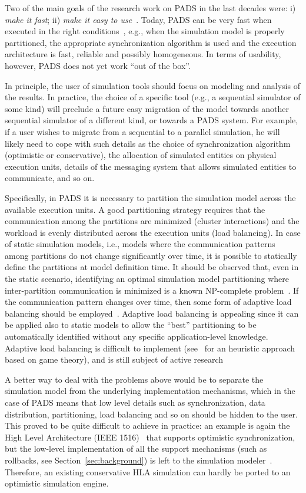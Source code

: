 \documentclass[1p]{elsarticle}
\begin{document}
Two of the main goals of the research work on PADS in the last decades
were: i) \emph{make it fast}; ii) \emph{make it easy to
  use}~\cite{fujtut2000}. Today, PADS can be very fast when executed
in the right conditions~\cite{Perumalla:2007:STW:1242531.1242543},
e.g., when the simulation model is properly partitioned, the
appropriate synchronization algorithm is used and the execution
architecture is fast, reliable and possibly homogeneous. In terms of
usability, however, PADS does not yet work ``out of the box''.

In principle, the user of simulation tools should focus on modeling
and analysis of the results. In practice, the choice of a specific
tool (e.g., a sequential simulator of some kind) will preclude a
future easy migration of the model towards another sequential
simulator of a different kind, or towards a PADS system.  For example,
if a user wishes to migrate from a sequential to a parallel
simulation, he will likely need to cope with such details as the
choice of synchronization algorithm (optimistic or conservative), the
allocation of simulated entities on physical execution units, details
of the messaging system that allows simulated entities to communicate,
and so on.

Specifically, in PADS it is necessary to partition the simulation
model across the available execution units. A good partitioning
strategy requires that the communication among the partitions are
minimized (cluster interactions) and the workload is evenly
distributed across the execution units (load balancing).
In case of static simulation models, i.e., models where the
communication patterns among partitions do not change significantly
over time, it is possible to statically define the partitions at model
definition time. It should be observed that, even in the static
scenario, identifying an optimal simulation model partitioning where
inter-partition communication is minimized is a known NP-complete
problem~\cite{Garey1979}.  If the communication pattern changes over
time, then some form of adaptive load balancing should be
employed~\cite{par-sim-today}. Adaptive load balancing is appealing
since it can be applied also to static models to allow the ``best''
partitioning to be automatically identified without any specific
application-level knowledge. Adaptive load balancing is difficult to
implement (see~\cite{Kurve2011} for an heuristic approach based on
game theory), and is still subject of active research

A better way to deal with the problems above would be to separate the
simulation model from the underlying implementation mechanisms, which
in the case of PADS means that low level details such as
synchronization, data distribution, partitioning, load balancing and
so on should be hidden to the user. This proved to be quite difficult
to achieve in practice: an example is again the High Level
Architecture (IEEE 1516)~\cite{ieee1516} that supports optimistic
synchronization, but the low-level implementation of all the support
mechanisms (such as rollbacks, see Section~\ref{sec:background}) is
left to the simulation modeler~\cite{Santoro2006}. Therefore, an existing 
conservative HLA simulation can hardly be ported to an optimistic 
simulation engine.
\end{document}
